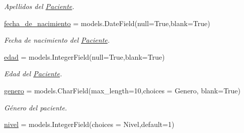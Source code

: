 \begin{DoxyCompactItemize}
\begin{DoxyCompactList}\small\item\em Apellidos del \hyperlink{classappEmotionIOT_1_1models_1_1Paciente}{Paciente}. \end{DoxyCompactList}\item 
\hyperlink{classappEmotionIOT_1_1models_1_1Paciente_acd99b9921d74c38042f2e2b67b1d26e9}{fecha\+\_\+de\+\_\+nacimiento} = models.\+Date\+Field(null=True,blank=True)\hypertarget{classappEmotionIOT_1_1models_1_1Paciente_acd99b9921d74c38042f2e2b67b1d26e9}{}\label{classappEmotionIOT_1_1models_1_1Paciente_acd99b9921d74c38042f2e2b67b1d26e9}

\begin{DoxyCompactList}\small\item\em Fecha de nacimiento del \hyperlink{classappEmotionIOT_1_1models_1_1Paciente}{Paciente}. \end{DoxyCompactList}\item 
\hyperlink{classappEmotionIOT_1_1models_1_1Paciente_a8dbd6cfa8e0feab754557f0e49a613ce}{edad} = models.\+Integer\+Field(null=True,blank=True)\hypertarget{classappEmotionIOT_1_1models_1_1Paciente_a8dbd6cfa8e0feab754557f0e49a613ce}{}\label{classappEmotionIOT_1_1models_1_1Paciente_a8dbd6cfa8e0feab754557f0e49a613ce}

\begin{DoxyCompactList}\small\item\em Edad del \hyperlink{classappEmotionIOT_1_1models_1_1Paciente}{Paciente}. \end{DoxyCompactList}\item 
\hyperlink{classappEmotionIOT_1_1models_1_1Paciente_afa61211ef5b37b69e99015cb4125cb78}{genero} = models.\+Char\+Field(max\+\_\+length=10,choices = Genero, blank=True)\hypertarget{classappEmotionIOT_1_1models_1_1Paciente_afa61211ef5b37b69e99015cb4125cb78}{}\label{classappEmotionIOT_1_1models_1_1Paciente_afa61211ef5b37b69e99015cb4125cb78}

\begin{DoxyCompactList}\small\item\em Género del paciente. \end{DoxyCompactList}\item 
\hyperlink{classappEmotionIOT_1_1models_1_1Paciente_af795a0e5c8ee5c2cb4b9c9d01d2b5fed}{nivel} = models.\+Integer\+Field(choices = Nivel,default=1)\hypertarget{classappEmotionIOT_1_1models_1_1Paciente_af795a0e5c8ee5c2cb4b9c9d01d2b5fed}{}\label{classappEmotionIOT_1_1models_1_1Paciente_af795a0e5c8ee5c2cb4b9c9d01d2b5fed}


\end{DoxyCompactItemize}
